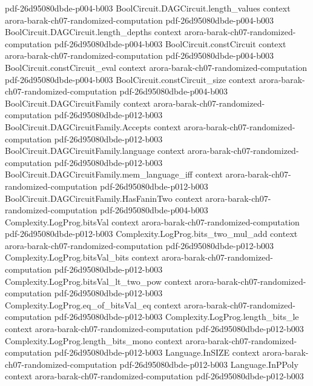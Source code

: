 \begin{theorem}
  {pdf-26d95080dbde-p004-b003}
\proofstep
  {BoolCircuit.DAGCircuit.length_values}
  {context}
  {arora-barak-ch07-randomized-computation}
  {pdf-26d95080dbde-p004-b003}
\proofstep
  {BoolCircuit.DAGCircuit.length_depths}
  {context}
  {arora-barak-ch07-randomized-computation}
  {pdf-26d95080dbde-p004-b003}
\proofstep
  {BoolCircuit.constCircuit}
  {context}
  {arora-barak-ch07-randomized-computation}
  {pdf-26d95080dbde-p004-b003}
\proofstep
  {BoolCircuit.constCircuit_eval}
  {context}
  {arora-barak-ch07-randomized-computation}
  {pdf-26d95080dbde-p004-b003}
\proofstep
  {BoolCircuit.constCircuit_size}
  {context}
  {arora-barak-ch07-randomized-computation}
  {pdf-26d95080dbde-p004-b003}
\proofstep
  {BoolCircuit.DAGCircuitFamily}
  {context}
  {arora-barak-ch07-randomized-computation}
  {pdf-26d95080dbde-p012-b003}
\proofstep
  {BoolCircuit.DAGCircuitFamily.Accepts}
  {context}
  {arora-barak-ch07-randomized-computation}
  {pdf-26d95080dbde-p012-b003}
\proofstep
  {BoolCircuit.DAGCircuitFamily.language}
  {context}
  {arora-barak-ch07-randomized-computation}
  {pdf-26d95080dbde-p012-b003}
\proofstep
  {BoolCircuit.DAGCircuitFamily.mem_language_iff}
  {context}
  {arora-barak-ch07-randomized-computation}
  {pdf-26d95080dbde-p012-b003}
\proofstep
  {BoolCircuit.DAGCircuitFamily.HasFaninTwo}
  {context}
  {arora-barak-ch07-randomized-computation}
  {pdf-26d95080dbde-p004-b003}
\proofstep
  {Complexity.LogProg.bitsVal}
  {context}
  {arora-barak-ch07-randomized-computation}
  {pdf-26d95080dbde-p012-b003}
\proofstep
  {Complexity.LogProg.bits_two_mul_add}
  {context}
  {arora-barak-ch07-randomized-computation}
  {pdf-26d95080dbde-p012-b003}
\proofstep
  {Complexity.LogProg.bitsVal_bits}
  {context}
  {arora-barak-ch07-randomized-computation}
  {pdf-26d95080dbde-p012-b003}
\proofstep
  {Complexity.LogProg.bitsVal_lt_two_pow}
  {context}
  {arora-barak-ch07-randomized-computation}
  {pdf-26d95080dbde-p012-b003}
\proofstep
  {Complexity.LogProg.eq_of_bitsVal_eq}
  {context}
  {arora-barak-ch07-randomized-computation}
  {pdf-26d95080dbde-p012-b003}
\proofstep
  {Complexity.LogProg.length_bits_le}
  {context}
  {arora-barak-ch07-randomized-computation}
  {pdf-26d95080dbde-p012-b003}
\proofstep
  {Complexity.LogProg.length_bits_mono}
  {context}
  {arora-barak-ch07-randomized-computation}
  {pdf-26d95080dbde-p012-b003}
\proofstep
  {Language.InSIZE}
  {context}
  {arora-barak-ch07-randomized-computation}
  {pdf-26d95080dbde-p012-b003}
\proofstep
  {Language.InPPoly}
  {context}
  {arora-barak-ch07-randomized-computation}
  {pdf-26d95080dbde-p012-b003}
\proofstep

\end{theorem}

